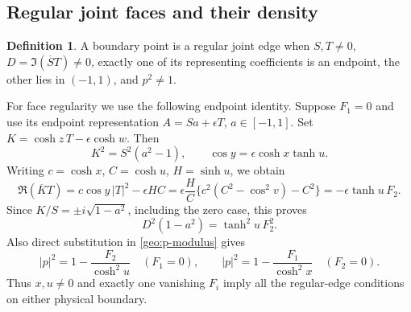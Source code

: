 \documentclass[11pt]{article}
\numberwithin{equation}{section}
\theoremstyle{definition}
\newtheorem{definition}[theorem]{Definition}
\begin{document}
\subsection{Regular joint faces and their density}
\begin{definition}\label{geo:regular-definition}
A boundary point is a regular joint edge when $S,T\ne0$,
$D=\Im(\overline S T)\ne0$, exactly one of its representing
coefficients is an endpoint, the other lies in $(-1,1)$, and $p^2\ne1$.
\end{definition}

For face regularity we use the following endpoint identity.  Suppose $F_1=0$ and use its
endpoint representation $A=Sa+\epsilon T$, $a\in[-1,1]$.
Set $K=\cosh z\,T-\epsilon\cosh w$.  Then
\[
 K^2=S^2(a^2-1),\qquad
 \cos y=\epsilon\cosh x\tanh u.
\]
Writing $c=\cosh x$, $C=\cosh u$, $H=\sinh u$, we obtain
\[
 \Re(\overline K T)
 =c\cos y\,|T|^2-\epsilon HC
 =\epsilon\frac HC\{c^2(C^2-\cos^2v)-C^2\}
 =-\epsilon\tanh u\,F_2.
\]
Since $K/S=\pm i\sqrt{1-a^2}$, including the zero case, this proves
\begin{equation}\label{geo:strict-face}
 D^2(1-a^2)=\tanh^2u\,F_2^2.
\end{equation}
Also direct substitution in \eqref{geo:p-modulus} gives
\begin{equation}\label{geo:p-edge}
 |p|^2=1-\frac{F_2}{\cosh^2u}\quad(F_1=0),\qquad
 |p|^2=1-\frac{F_1}{\cosh^2x}\quad(F_2=0).
\end{equation}
Thus $x,u\ne0$ and exactly one vanishing $F_i$ imply all the
regular-edge conditions on either physical boundary.
\end{document}

